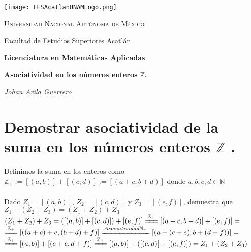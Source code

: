 \documentclass[a4paper,12pt]{article}
\begin{document}
\begin{titlepage}
    \centering
    \texttt{[image: FESAcatlanUNAMLogo.png]} %
    \vspace{1cm}
    
    {\scshape\large Universidad Nacional Autónoma de México \par}
    {\large Facultad de Estudios Superiores Acatlán \par}
    \vspace{1.5cm}
    
    {\Large\bfseries Licenciatura en Matemáticas Aplicadas \par}
    \vspace{2cm}
    
    {\Huge\bfseries  Asociatividad en los números enteros \(\mathbb{Z}\).

    \par}
    \vspace{2cm}
    
    {\Large\itshape Johan Avila Guerrero \par}
    \vfill
    
    
    \vfill
    
\end{titlepage}



\section*{Demostrar asociatividad de la suma en los números enteros \(\mathbb{Z}\) .}
\noindent   Definimos la suma en los enteros como \(\mathbb{Z}_{+} := [(a,b)] + [(c,d)] := [(a+c,b+d)] \) donde \(a,b,c,d \in \mathbb{N}\)  \\ \\
Dado \(Z_{1} = [(a,b)]\),  \(Z_{2} = [(c,d)]\) y \(Z_{3} = [(e,f)]\), demuestra que \(Z_{1} + (Z_{2} + Z_{3} )  = (Z_{1} + Z_{2} ) + Z_{3}  \) \\

 \((Z_{1} + Z_{2}) + Z_{3}   =  ([(a,b)] + [(c,d)]) +[(e,f)] \xlongequal[]{ \mathbb{Z}_{+}}  [(a+c,b+d)] + [(e,f)]  = \)\\ 
 
 \( \xlongequal[]{ \mathbb{Z}_{+}} [((a+c)+e ,  (b+d)+f )] \xlongequal[]{ Asociatividad \space \mathbb{N}_{+}} [(a+(c+e) ,  b+(d+f) )] =\) \\
 
 \(\xlongequal[]{ \mathbb{Z}_{+}} [(a,b)] + [(c+e, d+f)] \xlongequal[]{ \mathbb{Z}_{+}} [(a,b)] + ( [(c,d)] + [(e,f)] ) = Z_{1} + (Z_{2} + Z_{3} ) \)
 
\end{document}
